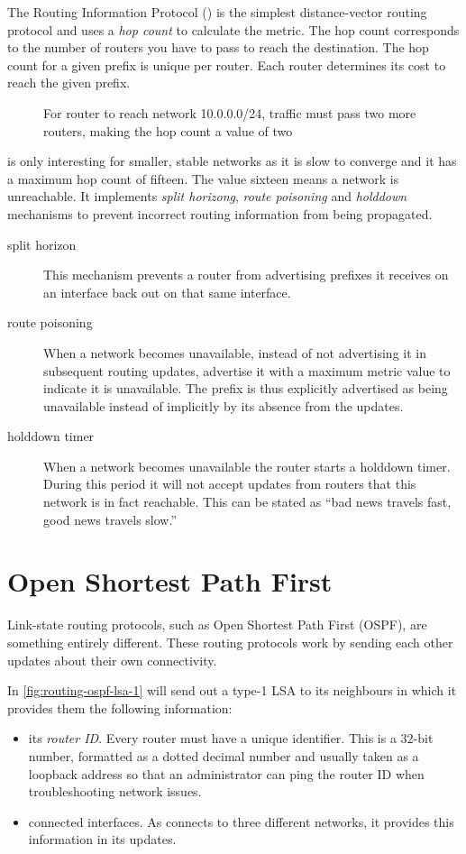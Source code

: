 The Routing Information Protocol () is the simplest distance-vector routing protocol and uses a \emph{hop count} to calculate the metric.
The hop count corresponds to the number of routers you have to pass to reach the destination.
The hop count for a given prefix is unique per router.
Each router determines its cost to reach the given prefix.


\begin{figure}
   \caption{For router  to reach network 10.0.0.0/24, traffic must pass two more routers, making the hop count a value of two}
   \label{fig:routing-rip-hop-count}
\end{figure}


 is only interesting for smaller, stable networks as it is slow to converge and it has a maximum hop count of fifteen.
The value sixteen means a network is unreachable.
It implements \emph{split horizong}, \emph{route poisoning} and \emph{holddown} mechanisms to prevent incorrect routing information from being propagated.

\begin{description}
\item[split horizon]
This mechanism prevents a router from advertising prefixes it receives on an interface back out on that same interface.
\item[route poisoning]
When a network becomes unavailable, instead of not advertising it in subsequent routing updates, advertise it with a maximum metric value to indicate it is unavailable.
The prefix is thus explicitly advertised as being unavailable instead of implicitly by its absence from the updates.
\item[holddown timer]
When a network becomes unavailable the router starts a holddown timer.
During this period it will not accept updates from routers that this network is in fact reachable.
This can be stated as ``bad news travels fast, good news travels slow.''
\end{description}


\section{Open Shortest Path First}
\label{sec:ospf}

Link-state routing protocols, such as Open Shortest Path First (OSPF), are something entirely different.
These routing protocols work by sending each other updates about their own connectivity.

In \cref{fig:routing-ospf-lsa-1}  will send out a type-1 LSA to its neighbours in which it provides them the following information:
\begin{itemize}
\item
   its \emph{router ID}.
   Every router must have a unique identifier.
   This is a 32-bit number, formatted as a dotted decimal number and usually taken as a loopback  address so that an administrator can ping the router ID when troubleshooting network issues.
\item 
   connected interfaces.
   As  connects to three different networks, it provides this information in its updates.
\end{itemize}

